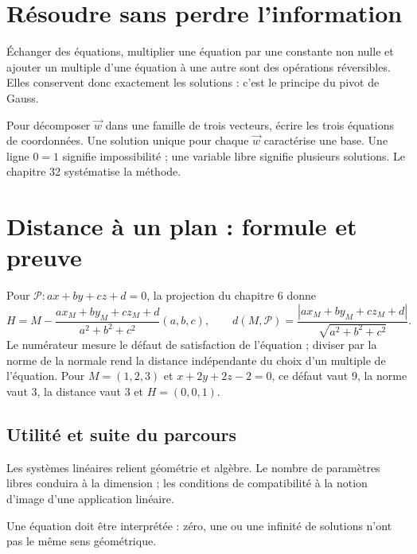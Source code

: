 \documentclass[../cours_tle.tex]{subfiles}
\begin{document}
\section{Résoudre sans perdre l'information}
Échanger des équations, multiplier une équation par une constante non nulle et ajouter un multiple d'une équation à une autre sont des opérations réversibles. Elles conservent donc exactement les solutions : c'est le principe du pivot de Gauss.

Pour décomposer $\vec w$ dans une famille de trois vecteurs, écrire les trois équations de coordonnées. Une solution unique pour chaque $\vec w$ caractérise une base. Une ligne $0=1$ signifie impossibilité ; une variable libre signifie plusieurs solutions. Le chapitre 32 systématise la méthode.
\section{Distance à un plan : formule et preuve}
Pour $\mathcal P:ax+by+cz+d=0$, la projection du chapitre 6 donne
\[
H=M-\frac{ax_M+by_M+cz_M+d}{a^2+b^2+c^2}(a,b,c),\qquad
 d(M,\mathcal P)=\frac{|ax_M+by_M+cz_M+d|}{\sqrt{a^2+b^2+c^2}}.
\]
Le numérateur mesure le défaut de satisfaction de l'équation ; diviser par la norme de la normale rend la distance indépendante du choix d'un multiple de l'équation.
Pour $M=(1,2,3)$ et $x+2y+2z-2=0$, ce défaut vaut $9$, la norme vaut $3$, la distance vaut $3$ et $H=(0,0,1)$.
\begin{finchapitre}
\section{Utilité et suite du parcours}
Les systèmes linéaires relient géométrie et algèbre. Le nombre de paramètres libres conduira à la dimension ; les conditions de compatibilité à la notion d'image d'une application linéaire.
\begin{retenir}
Une équation doit être interprétée : zéro, une ou une infinité de solutions n'ont pas le même sens géométrique.
\end{retenir}
\end{finchapitre}
\end{document}
